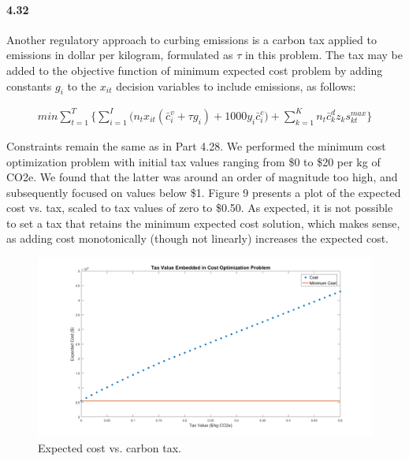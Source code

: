 \documentclass{article}
\begin{document}
\paragraph{4.32}
	Another regulatory approach to curbing emissions is a carbon tax applied to emissions in dollar per kilogram, formulated as $\tau$ in this problem. The tax may be added to the objective function of minimum expected cost problem by adding constants $g_i$ to the $x_{it}$ decision variables to include emissions, as follows:
	
	\begin{align*}
		min \sum_{t=1}^{T} \bigg\{ 
		\sum_{i=1}^{I} \big( n_t x_{it} (\bar{c}_i^v + \tau g_i) + 1000y_i \bar{c}_i^c \big)
		+ \sum_{k=1}^{K}  n_t \bar{c}_k^d z_k s_{kt}^{max}
		\bigg\}
	\end{align*}
	
	Constraints remain the same as in Part 4.28. We performed the minimum cost optimization problem with initial tax values ranging from \$0 to \$20 per kg of CO2e. We found that the latter was around an order of magnitude too high, and subsequently focused on values below \$1. Figure 9 presents a plot of the expected cost vs. tax, scaled to tax values of zero to \$0.50. As expected, it is not possible to set a tax that retains the minimum expected cost solution, which makes sense, as adding cost monotonically (though not linearly) increases the expected cost. 
	
	\begin{figure}
		\includegraphics[width=\textwidth]{432_9_cost_vs_tax_zoomed}
		\caption{Expected cost vs. carbon tax.}
	\end{figure}
	
\end{document}
